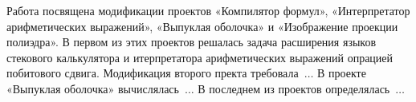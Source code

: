 Работа посвящена модификации проектов «Компилятор формул»,
«Интерпретатор арифметических выражений», «Выпуклая оболочка» и
«Изображение проекции полиэдра». В первом из этих проектов решалась
задача расширения языков стекового калькулятора и итерпретатора арифметических
выражений опрацией побитового сдвига.
Модификация второго пректа требовала~$\ldots$ В проекте
«Выпуклая оболочка» вычислялась~$\ldots$ В последнем из проектов
определялась~$\ldots$

